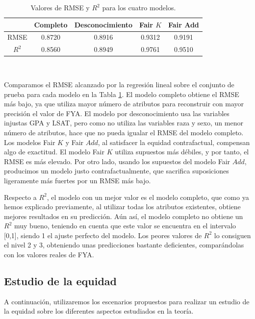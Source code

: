 \documentclass[oneside,openright,titlepage,numbers=noenddot,openany,headinclude,footinclude=true,
cleardoublepage=empty,abstractoff,BCOR=5mm,paper=a4,fontsize=12pt,main=spanish]{scrreprt}
\begin{document}
\begin{table}[h]
\centering
\resizebox{12.1cm}{!} {
\begin{tabular}{ccccc}
\hline
      & \textbf{Completo} & \textbf{Desconocimiento} & \textbf{Fair $K$} & \textbf{Fair Add} \\ \hline
RMSE  & 0.8720         & 0.8916                   & 0.9312            & 0.9191            \\ \hline
$R^2$ & 0.8560        & 0.8949                   & 0.9761            & 0.9510            \\ \hline
\end{tabular}
}
\caption{Valores de RMSE y $R^2$ para los cuatro modelos.}
\label{tab:coeficientes}
\end{table}\

Comparamos el RMSE alcanzado por la regresión lineal sobre el conjunto de prueba para cada modelo en la Tabla \ref{tab:coeficientes}. El modelo completo obtiene el RMSE más bajo, ya que utiliza mayor número de atributos para reconstruir con mayor precisión el valor de FYA. El modelo por desconocimiento usa las variables injustas GPA y LSAT, pero como no utiliza las variables raza y sexo, un menor número de atributos, hace que no pueda igualar el RMSE del modelo completo. Los modelos Fair $K$ y Fair $Add$, al satisfacer la equidad contrafactual, compensan algo de exactitud. El modelo Fair $K$ utiliza supuestos más débiles, y por tanto, el RMSE es más elevado. Por otro lado, usando los supuestos del modelo Fair $Add$, producimos un modelo justo contrafactualmente, que sacrifica suposiciones ligeramente más fuertes por un RMSE más bajo. 

Respecto a $R^2$, el modelo con un mejor valor es el modelo completo, que como ya hemos explicado previamente, al utilizar todas los atributos existentes, obtiene mejores resultados en su predicción. Aún así, el modelo completo no obtiene un $R^2$ muy bueno, teniendo en cuenta que este valor se encuentra en el intervalo [0,1], siendo 1 el ajuste perfecto del modelo. Los peores valores de $R^2$ lo consiguen el nivel 2 y 3, obteniendo unas predicciones bastante deficientes, comparándolas con los valores reales de FYA.

\subsection{Estudio de la equidad}

A continuación, utilizaremos los escenarios propuestos para realizar un estudio de la equidad sobre los diferentes aspectos estudiados en la teoría. 
\end{document}
